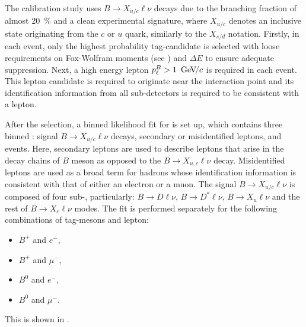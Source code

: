 The calibration study uses $B\rightarrow X_{u/c} \ell \nu$ decays due to the branching fraction of almost 20~\% and a clean experimental signature, 
where $X_{u/c}$ denotes an inclusive state originating from the $c$ or $u$ quark, similarly to the $X_{s/d}$ notation.
Firstly, in each event, only the highest \FEI probability tag-\B candidate is selected with loose requirements on Fox-Wolfram moments (see ) and $\Delta E$ to ensure adequate \epem\ra\qqbar suppression.
Next, a high energy lepton $p_{\ell}^B>1~{\mathrm{\,Ge\kern -0.1em V\!/}c}$ is required in each event.
This lepton candidate is required to originate near the interaction point and its identification information from all sub-detectors is required to be consistent with a lepton.

After the selection, a binned likelihood fit for \Mbc is set up, which contains three binned : signal $B\rightarrow X_{u/c}\ell\nu$ decays, 
secondary or misidentified leptons, and \epem\ra\qqbar events. Here, secondary leptons are used to describe leptons that arise in the decay chains of $B$ meson as opposed to the $B\rightarrow X_{u,c}\ell\nu$ decay.
Misidentified leptons are used as a broad term for hadrons whose identification information is consistent with that of either an electron or a muon.
The signal $B\rightarrow X_{u/c}\ell\nu$ \PDF is composed of four sub-, particularly: $B\rightarrow D\ell\nu$, $B\rightarrow D^*\ell\nu$, $B\rightarrow X_u\ell\nu$ and the rest of  $B\rightarrow X_c\ell\nu$ modes.
The fit is performed separately for the following combinations of tag-\B mesons and lepton:
\begin{itemize}
    \item $B^+$ and $e^-$,
    \item $B^+$ and $\mu^-$,
    \item $B^0$ and $e^-$,
    \item $B^0$ and $\mu^-$.
\end{itemize}
This is shown in .
